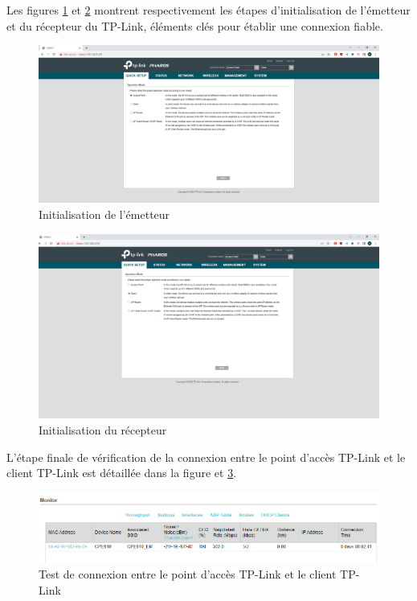Les figures \ref{Chap2.3.8} et \ref{Chap2.3.9} montrent respectivement les étapes d'initialisation de l'émetteur et du récepteur du TP-Link, éléments clés pour établir une connexion fiable.

\begin{figure}[H]
\centering
\includegraphics[width=15cm]{Images/tplink35.png}
\caption{Initialisation de l'émetteur}
\label{Chap2.3.8}
\end{figure}

\begin{figure}[H]
\centering
\includegraphics[width=15cm]{Images/tplink36.png}
\caption{Initialisation du récepteur}
\label{Chap2.3.9}
\end{figure}

L'étape finale de vérification de la connexion entre le point d'accès TP-Link et le client TP-Link est détaillée dans la figure et \ref{Chap2.3.11}.


\begin{figure}[H]
\centering
\includegraphics[width=15cm]{Images/TPLink4.png}
\caption{Test de connexion entre le point d'accès TP-Link et le client TP-Link}
\label{Chap2.3.11}
\end{figure}

